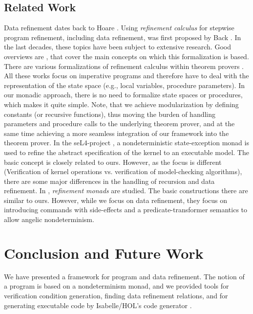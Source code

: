 \documentclass[11pt,a4paper]{book}
\begin{document}
\section{Related Work}
Data refinement dates back to Hoare \cite{Hoa72}. Using 
{\em refinement calculus} for stepwise program refinement, including data
refinement, was first proposed by Back \cite{Back78}.  In the last
decades, these topics have been subject to extensive research. Good
overviews are \cite{BaWr98,RoEn98}, that cover the main concepts on
which this formalization is based.  There are various formalizations
of refinement calculus within theorem provers
\cite{BaWr90,LRW95,RuWr97,Stap99,Preo06}.  All these works focus on
imperative programs and therefore have to deal with the representation
of the state space (e.g., local variables, procedure parameters).  In
our monadic approach, there is no need to formalize state spaces or
procedures, which makes it quite simple. Note, that we achieve
modularization by defining constants (or recursive functions), thus
moving the burden of handling parameters and procedure calls to the
underlying theorem prover, and at the same time achieving a more
seamless integration of our framework into the theorem prover. 
In the seL4-project \cite{CKS08}, a nondeterministic state-exception monad is
used to refine the abstract specification of the kernel to an
executable model. The basic concept is closely related to ours.
However, as the focus is different (Verification of kernel operations vs. 
verification of model-checking algorithms), there are some major differences in
the handling of recursion and data refinement. 
In \cite{SchM98}, {\em refinement monads} are studied. 
The basic constructions there are similar to ours. However, while we focus on
data refinement, they focus on introducing commands with side-effects and a 
predicate-transformer semantics to allow angelic nondeterminism.



\chapter{Conclusion and Future Work}
We have presented a framework for program and data refinement.
The notion of a program is based on a nondeterminism monad, and we provided
tools for verification condition generation, finding data 
refinement relations, and for generating executable code by 
Isabelle/HOL's code generator \cite{Haft09,HaNi10}.
\end{document}
